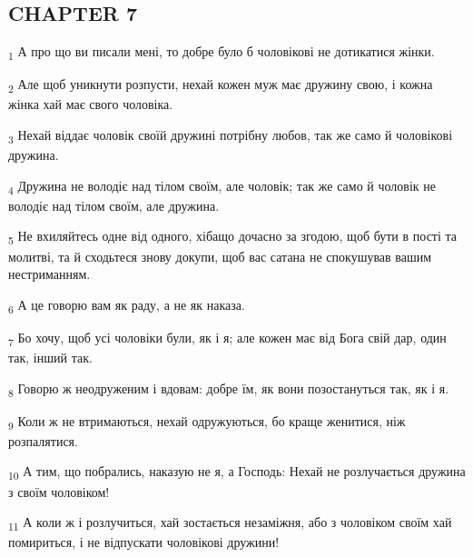 \subsection{CHAPTER 7}
\begin{tcolorbox}
\textsubscript{1} А про що ви писали мені, то добре було б чоловікові не дотикатися жінки.
\end{tcolorbox}
\begin{tcolorbox}
\textsubscript{2} Але щоб уникнути розпусти, нехай кожен муж має дружину свою, і кожна жінка хай має свого чоловіка.
\end{tcolorbox}
\begin{tcolorbox}
\textsubscript{3} Нехай віддає чоловік своїй дружині потрібну любов, так же само й чоловікові дружина.
\end{tcolorbox}
\begin{tcolorbox}
\textsubscript{4} Дружина не володіє над тілом своїм, але чоловік; так же само й чоловік не володіє над тілом своїм, але дружина.
\end{tcolorbox}
\begin{tcolorbox}
\textsubscript{5} Не вхиляйтесь одне від одного, хібащо дочасно за згодою, щоб бути в пості та молитві, та й сходьтеся знову докупи, щоб вас сатана не спокушував вашим нестриманням.
\end{tcolorbox}
\begin{tcolorbox}
\textsubscript{6} А це говорю вам як раду, а не як наказа.
\end{tcolorbox}
\begin{tcolorbox}
\textsubscript{7} Бо хочу, щоб усі чоловіки були, як і я; але кожен має від Бога свій дар, один так, інший так.
\end{tcolorbox}
\begin{tcolorbox}
\textsubscript{8} Говорю ж неодруженим і вдовам: добре їм, як вони позостануться так, як і я.
\end{tcolorbox}
\begin{tcolorbox}
\textsubscript{9} Коли ж не втримаються, нехай одружуються, бо краще женитися, ніж розпалятися.
\end{tcolorbox}
\begin{tcolorbox}
\textsubscript{10} А тим, що побрались, наказую не я, а Господь: Нехай не розлучається дружина з своїм чоловіком!
\end{tcolorbox}
\begin{tcolorbox}
\textsubscript{11} А коли ж і розлучиться, хай зостається незаміжня, або з чоловіком своїм хай помириться, і не відпускати чоловікові дружини!
\end{tcolorbox}
